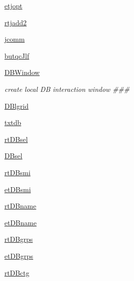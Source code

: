 \begin{DoxyCompactItemize}
\item 
\hyperlink{classmolSimplify_1_1Classes_1_1mGUI_1_1mGUI_af5d2180aa45621d70aed935625aaea3d}{etjopt}
\item 
\hyperlink{classmolSimplify_1_1Classes_1_1mGUI_1_1mGUI_a7e47c917655f6a53cc3cfc47d819a777}{rtjadd2}
\item 
\hyperlink{classmolSimplify_1_1Classes_1_1mGUI_1_1mGUI_af13311abf486fb8ead78a942d34346fb}{jcomm}
\item 
\hyperlink{classmolSimplify_1_1Classes_1_1mGUI_1_1mGUI_af55a7f9e2556b36dc7b274f0c3a32e42}{butqc\+Jlf}
\item 
\hyperlink{classmolSimplify_1_1Classes_1_1mGUI_1_1mGUI_a8472280c4f9c80ea0585ed617bfce872}{D\+B\+Window}
\begin{DoxyCompactList}\small\item\em create local DB interaction window \#\#\# \end{DoxyCompactList}\item 
\hyperlink{classmolSimplify_1_1Classes_1_1mGUI_1_1mGUI_aebdf529342cf11c3ee90bb0b1f754de9}{D\+Blgrid}
\item 
\hyperlink{classmolSimplify_1_1Classes_1_1mGUI_1_1mGUI_a63287240c079a92c94d1ac446fd841a9}{txtdb}
\item 
\hyperlink{classmolSimplify_1_1Classes_1_1mGUI_1_1mGUI_ad74ab67121f8f901147f706935af18bc}{rt\+D\+Bsel}
\item 
\hyperlink{classmolSimplify_1_1Classes_1_1mGUI_1_1mGUI_a2c8bc6c158cddf7fe4444a846b29ae3f}{D\+Bsel}
\item 
\hyperlink{classmolSimplify_1_1Classes_1_1mGUI_1_1mGUI_a2a6e0ea81c8bd4cd63ba4b815d7f5da4}{rt\+D\+Bsmi}
\item 
\hyperlink{classmolSimplify_1_1Classes_1_1mGUI_1_1mGUI_a67a5987468e4c92aaad9a1538ed5aca1}{et\+D\+Bsmi}
\item 
\hyperlink{classmolSimplify_1_1Classes_1_1mGUI_1_1mGUI_aebc1d2738bb0b3bb12e68dc1738c4c7d}{rt\+D\+Bname}
\item 
\hyperlink{classmolSimplify_1_1Classes_1_1mGUI_1_1mGUI_a106eb7314cf188ace0af21fa6bef608a}{et\+D\+Bname}
\item 
\hyperlink{classmolSimplify_1_1Classes_1_1mGUI_1_1mGUI_aa57dec12745c8c6ebcab4cada444c892}{rt\+D\+Bgrps}
\item 
\hyperlink{classmolSimplify_1_1Classes_1_1mGUI_1_1mGUI_adfff29fa9b40ed63261be2787c1b99ee}{et\+D\+Bgrps}
\item 
\hyperlink{classmolSimplify_1_1Classes_1_1mGUI_1_1mGUI_a6d3dfeec181881656bf66d414d152e66}{rt\+D\+Bctg}
\item 

\end{DoxyCompactItemize}
